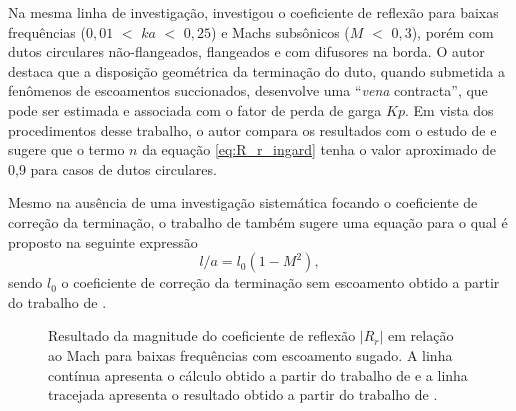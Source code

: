 Na mesma linha de investigação,  investigou o coeficiente de reflexão para baixas frequências ($0,01$ $<$ $ka$ $<$ $0,25$) e Machs subsônicos ($M$ $<$ $0,3$), porém com dutos circulares não-flangeados, flangeados e com difusores na borda. O autor destaca que a disposição geométrica da terminação do duto, quando submetida a fenômenos de escoamentos succionados, desenvolve uma ``\textit{vena} contracta'', que pode ser estimada e associada com o fator de perda de garga $Kp$. Em vista dos procedimentos desse trabalho, o autor compara os resultados com o estudo de  e sugere que o termo $n$ da equação \ref{eq:R_r_ingard} tenha o valor aproximado de 0,9 para casos de dutos circulares. 

Mesmo na ausência de uma investigação sistemática focando o coeficiente de correção da terminação, o trabalho de  também sugere uma equação para o qual é proposto na seguinte expressão
\begin{equation}
    l/a = l_{0}(1 - M^{2}),
    \label{eq:l_M}
\end{equation} 
sendo $l_{0}$ o coeficiente de correção da terminação sem escoamento obtido a partir do trabalho de .


\begin{figure}[h!]
\centering
  \caption[Coeficiente de reflexão $|R_{r}|$ com escoamento sugado]{Resultado da magnitude do coeficiente de reflexão $|R_{r}|$ em relação ao Mach para baixas frequências com escoamento sugado. A linha contínua apresenta o cálculo obtido a partir do trabalho de  e a linha tracejada apresenta o resultado obtido a partir do trabalho de .}
  \label{fig:comp3}
\end{figure}

